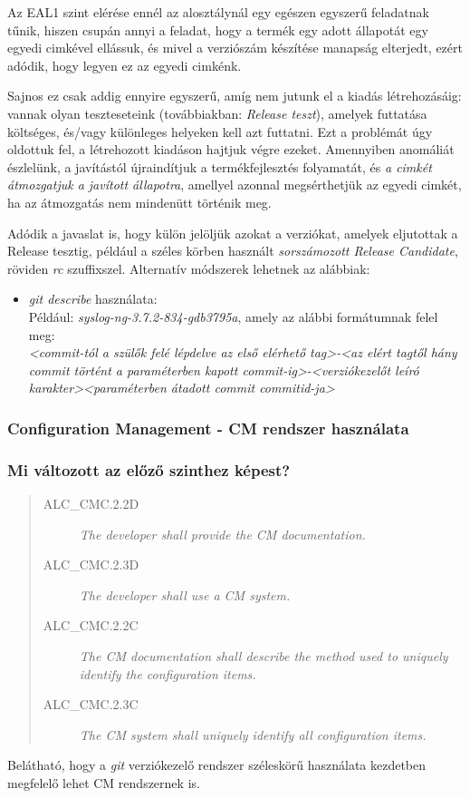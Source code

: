 Az EAL1 szint elérése ennél az alosztálynál egy egészen egyszerű feladatnak tűnik, hiszen csupán
annyi a feladat, hogy a termék egy adott állapotát egy egyedi cimkével ellássuk, és mivel a
verziószám készítése manapság elterjedt, ezért adódik, hogy legyen ez az egyedi cimkénk.

Sajnos ez csak addig ennyire egyszerű, amíg nem jutunk el a kiadás létrehozásáig:
vannak olyan teszteseteink (továbbiakban: \emph{Release teszt}),
amelyek futtatása költséges, és/vagy különleges helyeken kell azt
futtatni. Ezt a problémát úgy oldottuk fel, a létrehozott kiadáson hajtjuk végre ezeket.
Amennyiben anomáliát észlelünk, a javítástól újraindítjuk a termékfejlesztés folyamatát,
és \emph{a cimkét átmozgatjuk a javított állapotra}, amellyel azonnal megsérthetjük az egyedi
cimkét, ha az átmozgatás nem mindenütt történik meg.

Adódik a javaslat is, hogy külön jelöljük azokat a verziókat, amelyek eljutottak a Release tesztig,
például a széles körben használt \emph{sorszámozott Release Candidate}, röviden \emph{rc}
szuffixszel.
Alternatív módszerek lehetnek az alábbiak:
\begin{itemize}
    \item \emph{git describe} használata: \\
        Például: \emph{syslog-ng-3.7.2-834-gdb3795a}, amely az alábbi formátumnak felel meg: \\
        \emph{<commit-tól a szülők felé lépdelve az első elérhető tag>-<az elért tagtől hány commit
            történt a paraméterben kapott commit-ig>-<verziókezelőt leíró karakter><paraméterben
        átadott commit commitid-ja>}
\end{itemize}

\pagebreak[0]
\subsubsection{Configuration Management - CM rendszer használata}
\subsubsection{Mi változott az előző szinthez képest?}

\begin{quote}
    \begin{description}
        \item[ALC\_CMC.2.2D]{\emph{The developer shall provide the CM documentation.}}
        \item[ALC\_CMC.2.3D]{\emph{The developer shall use a CM system.}}
        \item[ALC\_CMC.2.2C]{\emph{The CM documentation shall describe the method used to uniquely
            identify the configuration items.}}
        \item[ALC\_CMC.2.3C]{\emph{The CM system shall uniquely identify all configuration items.}}
    \end{description}
\end{quote}
Belátható, hogy a \emph{git} verziókezelő rendszer széleskörű használata kezdetben megfelelő
lehet CM rendszernek is.

